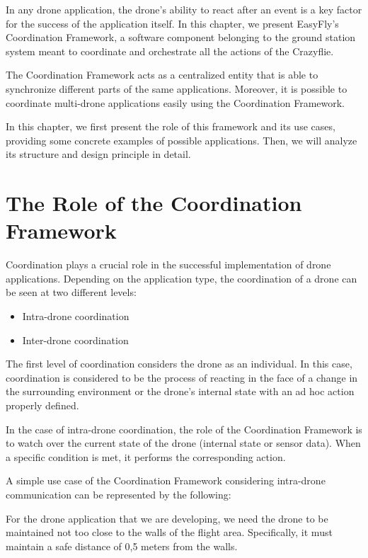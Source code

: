 In any drone application, the drone's ability to react after an event is a key factor for the success of the application itself. 
In this chapter, we present EasyFly's Coordination Framework, a software component belonging to the ground station system meant to coordinate and orchestrate all the actions of the Crazyflie. 

The Coordination Framework acts as a centralized entity that is able to synchronize different parts of the same applications.
Moreover, it is possible to coordinate multi-drone applications easily using the Coordination Framework.

In this chapter, we first present the role of this framework and its use cases, providing some concrete examples of possible applications. 
Then, we will analyze its structure and design principle in detail.


\section{The Role of the Coordination Framework}\label{sec:coordination_framework_rolw}

Coordination plays a crucial role in the successful implementation of drone applications. 
Depending on the application type, the coordination of a drone can be seen at two different levels:
\begin{itemize}
    \item Intra-drone coordination
    \item Inter-drone coordination
\end{itemize}

The first level of coordination considers the drone as an individual. 
In this case, coordination is considered to be the process of reacting in the face of a change in the surrounding environment or the drone's internal state with an ad hoc action properly defined.

In the case of intra-drone coordination, the role of the Coordination Framework is to watch over the current state of the drone (internal state or sensor data). 
When a specific condition is met, it performs the corresponding action.

A simple use case of the Coordination Framework considering intra-drone communication can be represented by the following:

\begin{displayquote}
    For the drone application that we are developing, we need the drone to be maintained not too close to the walls of the flight area. 
    Specifically, it must maintain a safe distance of 0,5 meters from the walls.
\end{displayquote}

